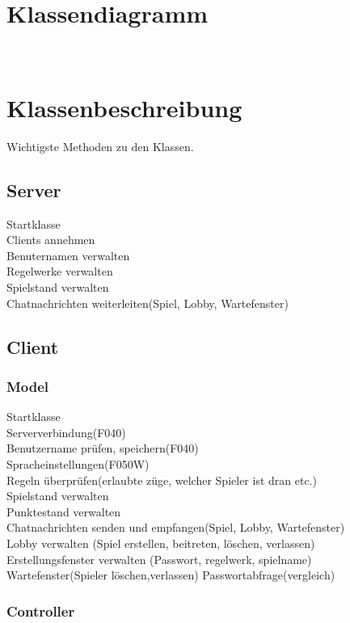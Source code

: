 \documentclass{article}
\begin{document}
\section{Klassendiagramm}
\ \\
\section{Klassenbeschreibung}
Wichtigste Methoden zu den Klassen.
	\subsection{Server}
		Startklasse \\
		Clients annehmen \\
		Benuternamen verwalten \\
		Regelwerke verwalten \\
		Spielstand verwalten \\
		Chatnachrichten weiterleiten(Spiel, Lobby, Wartefenster) \\
	\subsection{Client}
	\subsubsection{Model}
		Startklasse \\
		Serververbindung(F040)\\
		Benutzername prüfen, speichern(F040)\\
		Spracheinstellungen(F050W) \\
		Regeln überprüfen(erlaubte züge, welcher Spieler ist dran etc.)\\
		Spielstand verwalten \\
		Punktestand verwalten\\
		Chatnachrichten senden und empfangen(Spiel, Lobby, Wartefenster) \\
		Lobby	verwalten (Spiel erstellen, beitreten, löschen, verlassen)\\	
		Erstellungsfenster verwalten (Passwort, regelwerk, spielname)\\
		Wartefenster(Spieler löschen,verlassen)
		Passwortabfrage(vergleich)\\
	\subsubsection{Controller}
\end{document}
